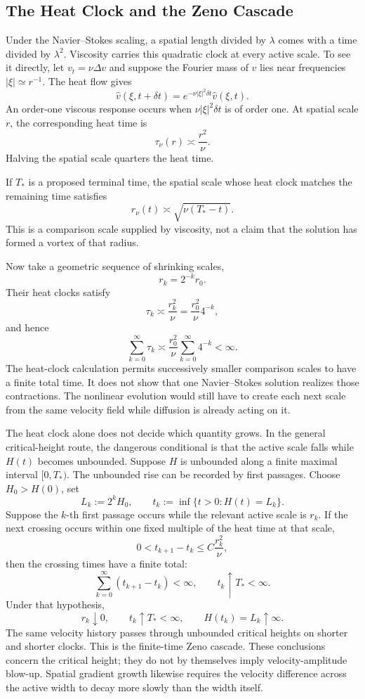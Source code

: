 \subsection{The Heat Clock and the Zeno Cascade}\label{sub:BodyHeatClock}

Under the Navier--Stokes scaling, a spatial length divided by \(\lambda\) comes with a time divided by \(\lambda^2\).
Viscosity carries this quadratic clock at every active scale.
To see it directly, let \(v_t=\nu\Delta v\) and suppose the Fourier mass of \(v\) lies near frequencies \(|\xi|\simeq r^{-1}\).
The heat flow gives
\[
  \widehat v(\xi,t+\delta t)
  =e^{-\nu|\xi|^2\delta t}\widehat v(\xi,t).
\]
An order-one viscous response occurs when \(\nu|\xi|^2\delta t\) is of order one.
At spatial scale \(r\), the corresponding heat time is
\begin{equation}\label{eq:BodyHeatComparisonTime}
  \tau_\nu(r)
  \asymp\frac{r^2}{\nu}.
\end{equation}
Halving the spatial scale quarters the heat time.

If \(T_*\) is a proposed terminal time, the spatial scale whose heat clock matches the remaining time satisfies
\[
  r_\nu(t)
  \asymp\sqrt{\nu(T_*-t)}.
\]
This is a comparison scale supplied by viscosity, not a claim that the solution has formed a vortex of that radius.

Now take a geometric sequence of shrinking scales,
\[
  r_k=2^{-k}r_0.
\]
Their heat clocks satisfy
\[
  \tau_k
  \asymp\frac{r_k^2}{\nu}
  =\frac{r_0^2}{\nu}4^{-k},
\]
and hence
\[
  \sum_{k=0}^{\infty}\tau_k
  \asymp
  \frac{r_0^2}{\nu}
  \sum_{k=0}^{\infty}4^{-k}
  <\infty.
\]
The heat-clock calculation permits successively smaller comparison scales to have a finite total time.
It does not show that one Navier--Stokes solution realizes those contractions.
The nonlinear evolution would still have to create each next scale from the same velocity field while diffusion is already acting on it.

The heat clock alone does not decide which quantity grows.
In the general critical-height route, the dangerous conditional is that the active scale falls while \(H(t)\) becomes unbounded.
Suppose \(H\) is unbounded along a finite maximal interval \([0,T_*)\).
The unbounded rise can be recorded by first passages.
Choose \(H_0>H(0)\), set
\[
  L_k:=2^kH_0,
  \qquad
  t_k:=\inf\{t>0:H(t)=L_k\}.
\]
Suppose the \(k\)-th first passage occurs while the relevant active scale is \(r_k\).
If the next crossing occurs within one fixed multiple of the heat time at that scale,
\[
  0<t_{k+1}-t_k
  \leq C\frac{r_k^2}{\nu},
\]
then the crossing times have a finite total:
\[
  \sum_{k=0}^{\infty}(t_{k+1}-t_k)<\infty,
  \qquad
  t_k\uparrow T_*<\infty.
\]
Under that hypothesis,
\[
  r_k\downarrow0,
  \qquad
  t_k\uparrow T_*<\infty,
  \qquad
  H(t_k)=L_k\uparrow\infty.
\]
The same velocity history passes through unbounded critical heights on shorter and shorter clocks.
This is the finite-time Zeno cascade.
These conclusions concern the critical height; they do not by themselves imply velocity-amplitude blow-up.
Spatial gradient growth likewise requires the velocity difference across the active width to decay more slowly than the width itself.

